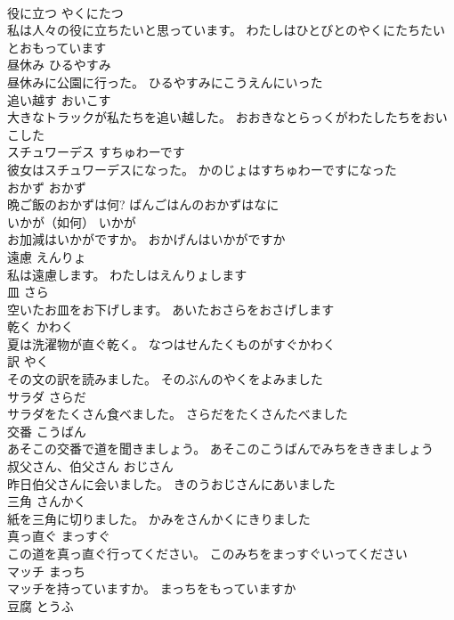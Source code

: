 \documentclass[8pt]{extreport}
\begin{document}
\begin{CJK}{UTF8}{min}
\\	役に立つ	やくにたつ	
\\	私は人々の役に立ちたいと思っています。	わたしはひとびとのやくにたちたいとおもっています	
\\	昼休み	ひるやすみ	
\\	昼休みに公園に行った。	ひるやすみにこうえんにいった	
\\	追い越す	おいこす	
\\	大きなトラックが私たちを追い越した。	おおきなとらっくがわたしたちをおいこした	
\\	スチュワーデス	すちゅわーです	
\\	彼女はスチュワーデスになった。	かのじょはすちゅわーですになった	
\\	おかず	おかず	
\\	晩ご飯のおかずは何?	ばんごはんのおかずはなに	
\\	いかが（如何）	いかが	
\\	お加減はいかがですか。	おかげんはいかがですか	
\\	遠慮	えんりょ	
\\	私は遠慮します。	わたしはえんりょします	
\\	皿	さら	
\\	空いたお皿をお下げします。	あいたおさらをおさげします	
\\	乾く	かわく	
\\	夏は洗濯物が直ぐ乾く。	なつはせんたくものがすぐかわく	
\\	訳	やく	
\\	その文の訳を読みました。	そのぶんのやくをよみました	
\\	サラダ	さらだ	
\\	サラダをたくさん食べました。	さらだをたくさんたべました	
\\	交番	こうばん	
\\	あそこの交番で道を聞きましょう。	あそこのこうばんでみちをききましょう	
\\	叔父さん、伯父さん	おじさん	
\\	昨日伯父さんに会いました。	きのうおじさんにあいました	
\\	三角	さんかく	
\\	紙を三角に切りました。	かみをさんかくにきりました	
\\	真っ直ぐ	まっすぐ	
\\	この道を真っ直ぐ行ってください。	このみちをまっすぐいってください	
\\	マッチ	まっち	
\\	マッチを持っていますか。	まっちをもっていますか	
\\	豆腐	とうふ	

\end{CJK}
\end{document}
